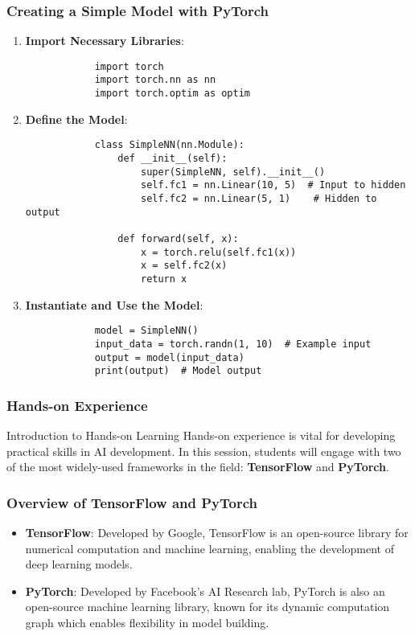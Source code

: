 \documentclass{beamer}
\begin{document}
\begin{frame}[fragile]
    \frametitle{Creating a Simple Model with PyTorch}
    \begin{enumerate}
        \item \textbf{Import Necessary Libraries}:
            \begin{lstlisting}
            import torch
            import torch.nn as nn
            import torch.optim as optim
            \end{lstlisting}
        \item \textbf{Define the Model}:
            \begin{lstlisting}
            class SimpleNN(nn.Module):
                def __init__(self):
                    super(SimpleNN, self).__init__()
                    self.fc1 = nn.Linear(10, 5)  # Input to hidden
                    self.fc2 = nn.Linear(5, 1)    # Hidden to output

                def forward(self, x):
                    x = torch.relu(self.fc1(x))
                    x = self.fc2(x)
                    return x
            \end{lstlisting}
        \item \textbf{Instantiate and Use the Model}:
            \begin{lstlisting}
            model = SimpleNN()
            input_data = torch.randn(1, 10)  # Example input
            output = model(input_data)
            print(output)  # Model output
            \end{lstlisting}
    \end{enumerate}
\end{frame}

\begin{frame}
    \frametitle{Hands-on Experience}
    \begin{block}{Introduction to Hands-on Learning}
        Hands-on experience is vital for developing practical skills in AI development. In this session, students will engage with two of the most widely-used frameworks in the field: \textbf{TensorFlow} and \textbf{PyTorch}.
    \end{block}
\end{frame}

\begin{frame}
    \frametitle{Overview of TensorFlow and PyTorch}
    \begin{itemize}
        \item \textbf{TensorFlow}: Developed by Google, TensorFlow is an open-source library for numerical computation and machine learning, enabling the development of deep learning models.
        \item \textbf{PyTorch}: Developed by Facebook’s AI Research lab, PyTorch is also an open-source machine learning library, known for its dynamic computation graph which enables flexibility in model building.
    \end{itemize}
\end{frame}
\end{document}
